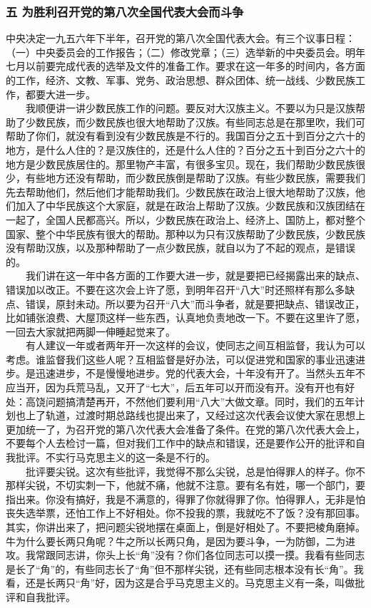 \documentclass[cn,11pt,chinese]{elegantbook}
\def\myformat#1{\hfil\hfil #1}
\begin{document}
\subsubsection*{\myformat{五 为胜利召开党的第八次全国代表大会而斗争}}
中央决定一九五六年下半年，召开党的第八次全国代表大会。有三个议事日程：（一）中央委员会的工作报告；（二）修改党章；（三）选举新的中央委员会。明年七月以前要完成代表的选举及文件的准备工作。要求在这一年多的时间内，各方面的工作，经济、文教、军事、党务、政治思想、群众团体、统一战线、少数民族工作，都要大进一步。\\
　　我顺便讲一讲少数民族工作的问题。要反对大汉族主义。不要以为只是汉族帮助了少数民族，而少数民族也很大地帮助了汉族。有些同志总是在那里吹，我们可帮助了你们，就没有看到没有少数民族是不行的。我国百分之五十到百分之六十的地方，是什么人住的？是汉族住的，还是什么人住的？百分之五十到百分之六十的地方是少数民族居住的。那里物产丰富，有很多宝贝。现在，我们帮助少数民族很少，有些地方还没有帮助，而少数民族倒是帮助了汉族。有些少数民族，需要我们先去帮助他们，然后他们才能帮助我们。少数民族在政治上很大地帮助了汉族，他们加入了中华民族这个大家庭，就是在政治上帮助了汉族。少数民族和汉族团结在一起了，全国人民都高兴。所以，少数民族在政治上、经济上、国防上，都对整个国家、整个中华民族有很大的帮助。那种以为只有汉族帮助了少数民族，少数民族没有帮助汉族，以及那种帮助了一点少数民族，就自以为了不起的观点，是错误的。\\
　　我们讲在这一年中各方面的工作要大进一步，就是要把已经揭露出来的缺点、错误加以改正。不要在这次会上许了愿，到明年召开“八大”时还照样有那么多缺点、错误，原封未动。所以要为召开“八大”而斗争者，就是要把缺点、错误改正，比如铺张浪费、大屋顶这样一些东西，认真地负责地改一下。不要在这里许了愿，一回去大家就把两脚一伸睡起觉来了。\\
　　有人建议一年或者两年开一次这样的会议，使同志之间互相监督，我认为可以考虑。谁监督我们这些人呢？互相监督是好办法，可以促进党和国家的事业迅速进步。是迅速进步，不是慢慢地进步。党的代表大会，十年没有开了。当然头五年不应当开，因为兵荒马乱，又开了“七大”，后五年可以开而没有开。没有开也有好处：高饶问题搞清楚再开，不然他们要利用“八大”大做文章。同时，我们的五年计划也上了轨道，过渡时期总路线也提出来了，又经过这次代表会议使大家在思想上更加统一了，为召开党的第八次代表大会准备了条件。在党的第八次代表大会上，不要每个人去检讨一篇，但对我们工作中的缺点和错误，还是要作公开的批评和自我批评。不实行马克思主义的这一条是不行的。\\
　　批评要尖锐。这次有些批评，我觉得不那么尖锐，总是怕得罪人的样子。你不那样尖锐，不切实刺一下，他就不痛，他就不注意。要有名有姓，哪一个部门，要指出来。你没有搞好，我是不满意的，得罪了你就得罪了你。怕得罪人，无非是怕丧失选举票，还怕工作上不好相处。你不投我的票，我就吃不了饭？没有那回事。其实，你讲出来了，把问题尖锐地摆在桌面上，倒是好相处了。不要把棱角磨掉。牛为什么要长两只角呢？牛之所以长两只角，是因为要斗争，一为防御，二为进攻。我常跟同志讲，你头上长“角”没有？你们各位同志可以摸一摸。我看有些同志是长了“角”的，有些同志长了“角”但不那样尖锐，还有些同志根本没有长“角”。我看，还是长两只“角”好，因为这是合乎马克思主义的。马克思主义有一条，叫做批评和自我批评。\\
\end{document}
